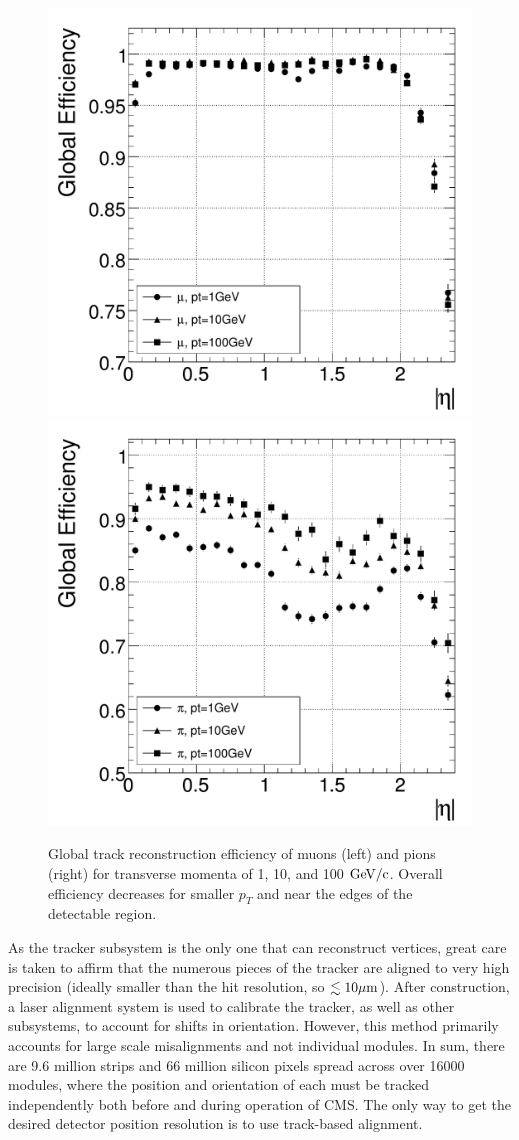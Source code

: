 \begin{figure}[htbp]
\begin{center}
\includegraphics[width=.45\linewidth]{Experiment/figures/MuonTrackEfficiency.pdf}
\includegraphics[width=.45\linewidth]{Experiment/figures/PionTrackEfficiency.pdf}
\caption[Global Track Reconstruction Efficiency at CMS]{Global track reconstruction efficiency of muons (left) and pions (right) for transverse momenta of 1, 10, and 100 $\rm{GeV}/c$. Overall efficiency decreases for smaller $p_T$ and near the edges of the detectable region.}
\label{fig:TrackEfficiency}
\end{center}
\end{figure}

As the tracker subsystem is the only one that can reconstruct vertices, great care is taken to affirm that the numerous pieces of the tracker are aligned to very high precision (ideally smaller than the hit resolution, so $\lesssim10\mu\rm{m}$). After construction, a laser alignment system is used to calibrate the tracker, as well as other subsystems, to account for shifts in orientation. However, this method primarily accounts for large scale misalignments and not individual modules. In sum, there are 9.6 million strips and 66 million silicon pixels spread across over 16000 modules, where the position and orientation of each must be tracked independently both before and during operation of CMS. The only way to get the desired detector position resolution is to use track-based alignment.

